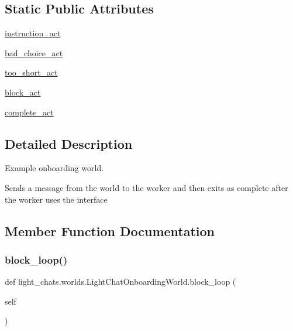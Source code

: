 \subsection*{Static Public Attributes}
\begin{DoxyCompactItemize}
\item 
\hyperlink{classlight__chats_1_1worlds_1_1LightChatOnboardingWorld_ac58184f481cddc78dfb2909d556d3e33}{instruction\+\_\+act}
\item 
\hyperlink{classlight__chats_1_1worlds_1_1LightChatOnboardingWorld_a49379d531932e29b9c46e39f58ba4b3f}{bad\+\_\+choice\+\_\+act}
\item 
\hyperlink{classlight__chats_1_1worlds_1_1LightChatOnboardingWorld_a453d8cca9b845c1644aba754fb6d4395}{too\+\_\+short\+\_\+act}
\item 
\hyperlink{classlight__chats_1_1worlds_1_1LightChatOnboardingWorld_adcd8a5e6c547a238d4997192ba578d13}{block\+\_\+act}
\item 
\hyperlink{classlight__chats_1_1worlds_1_1LightChatOnboardingWorld_a6b842c3f069204e081873dc41d349b93}{complete\+\_\+act}
\end{DoxyCompactItemize}


\subsection{Detailed Description}
\begin{DoxyVerb}Example onboarding world.

Sends a message from the world to the worker and then exits as complete after the
worker uses the interface
\end{DoxyVerb}
 

\subsection{Member Function Documentation}
\mbox{\label{classlight__chats_1_1worlds_1_1LightChatOnboardingWorld_a0f913f08e74b21ad1d6b04c302e38850}} 
\subsubsection{\texorpdfstring{block\+\_\+loop()}{block\_loop()}}
{\footnotesize\ttfamily def light\+\_\+chats.\+worlds.\+Light\+Chat\+Onboarding\+World.\+block\+\_\+loop (\begin{DoxyParamCaption}\item[{}]{self }\end{DoxyParamCaption})}

